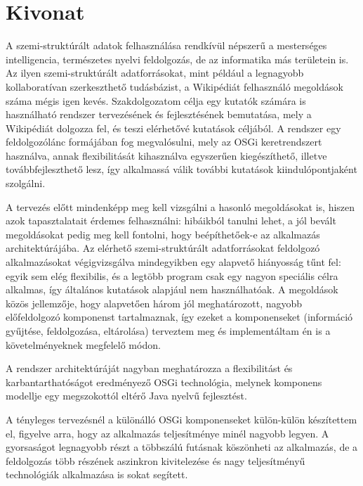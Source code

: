 \chapter*{Kivonat}

A szemi-struktúrált adatok felhasználása rendkívül népszerű a mesterséges intelligencia, természetes nyelvi feldolgozás, de az informatika más területein is. Az ilyen szemi-struktúrált adatforrásokat, mint például a legnagyobb kollaboratívan szerkeszthető tudásbázist, a Wikipédiát felhasználó megoldások száma mégis igen kevés. Szakdolgozatom célja egy kutatók számára is használható rendszer tervezésének és fejlesztésének bemutatása, mely a Wikipédiát dolgozza fel, és teszi elérhetővé kutatások céljából. A rendszer egy feldolgozólánc formájában fog megvalósulni, mely az OSGi keretrendszert használva, annak flexibilitását kihasználva egyszerűen kiegészíthető, illetve továbbfejleszthető lesz, így alkalmassá válik további kutatások kiindulópontjaként szolgálni.

A tervezés előtt mindenképp meg kell vizsgálni a hasonló megoldásokat is, hiszen azok tapasztalatait érdemes felhasználni: hibáikból tanulni lehet, a jól bevált megoldásokat pedig meg kell fontolni, hogy beépíthetőek-e az alkalmazás architektúrájába. Az elérhető szemi-struktúrált adatforrásokat feldolgozó alkalmazásokat végigvizsgálva mindegyikben egy alapvető hiányosság tűnt fel: egyik sem elég flexibilis, és a legtöbb program csak egy nagyon speciális célra alkalmas, így általános kutatások alapjául nem használhatóak. A megoldások közös jellemzője, hogy alapvetően három jól meghatározott, nagyobb előfeldolgozó komponenst tartalmaznak, így ezeket a komponenseket (információ gyűjtése, feldolgozása, eltárolása) terveztem meg és implementáltam én is a követelményeknek megfelelő módon.

A rendszer architektúráját nagyban meghatározza a flexibilitást és karbantarthatóságot eredményező OSGi technológia, melynek komponens modellje egy megszokottól eltérő Java nyelvű fejlesztést.

A tényleges tervezésnél a különálló OSGi komponenseket külön-külön készítettem el, figyelve arra, hogy az alkalmazás teljesítménye minél nagyobb legyen. A gyorsaságot legnagyobb részt a többszálú futásnak köszönheti az alkalmazás, de a feldolgozás több részének aszinkron kivitelezése és nagy teljesítményű technológiák alkalmazása is sokat segített.

